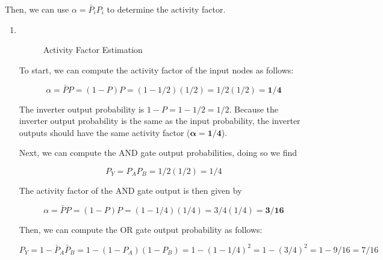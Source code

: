 \documentclass[fleqn]{article}
\begin{document}
\begin{enumerate}
		Then, we can use $\alpha = \bar{P}_iP_i$ to determine the activity factor.
		
		\begin{enumerate}
			\item ~
			
			\begin{figure}[H]				
				\centerline{}
				\caption{Activity Factor Estimation}
				\label{fig::activity_factor_a}
			\end{figure}
			
			To start, we can compute the activity factor of the input nodes as follows:
			
			\begin{equation*}
				\alpha = \bar{P}P = (1 - P)P = (1 - 1/2)(1/2) = 1/2(1/2) = \mathbf{1/4}
			\end{equation*}
			
			The inverter output probability is $1 - P = 1 - 1/2 = 1/2$. Because the inverter output probability is the same as the input probability, the inverter outputs should have the same activity factor ($\mathbf{\alpha = 1/4}$).
			
			Next, we can compute the AND gate output probabilities, doing so we find
			
			\begin{equation*}
				P_Y = P_AP_B = 1/2(1/2) = 1/4
			\end{equation*}
			
			The activity factor of the AND gate output is then given by
			
			\begin{equation*}
				\alpha = \bar{P}P = (1 - P)P = (1 - 1/4)(1/4) = 3/4(1/4) = \mathbf{3/16}
			\end{equation*}
			
			Then, we can compute the OR gate output probability as follows:
			
			\begin{equation*}
				P_Y = 1 - \bar{P}_A\bar{P}_B = 1 - (1 - P_A)(1 - P_B) = 1 - (1 - 1/4)^2 = 1 - (3/4)^2 = 1 - 9/16 = 7/16
			\end{equation*}
			

\end{enumerate}
\end{enumerate}
\end{document}
